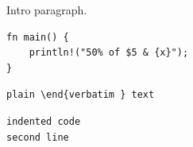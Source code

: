 Intro paragraph.

\begin{verbatim}
fn main() {
    println!("50% of $5 & {x}");
}
\end{verbatim}

\begin{verbatim}
plain \end{verbatim } text
\end{verbatim}

\begin{verbatim}
indented code
second line
\end{verbatim}
